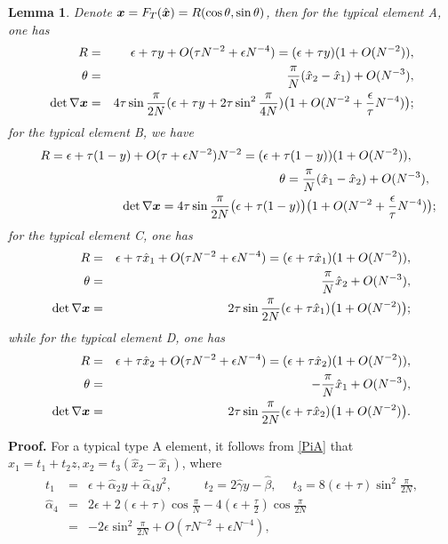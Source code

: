 \documentclass[12pt]{article}
\renewcommand{\vec}[1]{\mbox{\boldmath$#1$}}
\newtheorem{lemma}[theorem]{Lemma}
\numberwithin{equation}{section}
\begin{document}
\begin{lemma}\label{wgp}
Denote $\vec{x}=F_T(\hat{\vec{x}})=R(\cos \theta, \sin \theta)$, then for
the typical element A, one has
\begin{eqnarray}
R &=&\epsilon+\tau y+O(\tau N^{-2}+\epsilon N^{-4})=(\epsilon+
\tau y)(1+O(N^{-2})),\label{rhoA}\\
\theta &=&\frac{\pi}{N}(\hat{x}_2-\hat{x}_1)+O(N^{-3}),\label{thetaA}\\
\det \nabla \vec{x}&=&4\tau \sin \frac{\pi}{2N}(\epsilon+\tau y+2\tau
\sin^2 \frac{\pi}{4N})\big(1+O(N^{-2}+\frac{\epsilon}{\tau}N^{-4})\big); \label{detA}
\end{eqnarray}
for the typical element B, we have
\begin{eqnarray}
&&R =\epsilon+\tau (1-y)+O(\tau +\epsilon N^{-2})N^{-2}=(\epsilon+\tau (1-y))(1+O(N^{-2})),
\qquad \label{rhoB}\\
&&\theta =\frac{\pi}{N}(\hat{x}_1-\hat{x}_2)+O(N^{-3}),\;\;\label{thetaB}\\
&&\det \nabla \vec{x}=4\tau \sin \frac{\pi}{2N}\big(\epsilon+\tau(1-y)\big)
\big(1+O(N^{-2}+\frac{\epsilon}{\tau}N^{-4})\big); \label{detB}
\end{eqnarray}
for the typical element C, one has
\begin{eqnarray}
R &=&\epsilon+\tau \hat{x}_1+O(\tau N^{-2}+\epsilon N^{-4})=(\epsilon+
\tau \hat{x}_1)(1+O(N^{-2})),\label{rhoC}\\
\theta &=&\frac{\pi}{N}\hat{x}_2+O(N^{-3}),\label{thetaC}\\
\det \nabla \vec{x}&=&2\tau \sin \frac{\pi}{2N}(\epsilon+\tau \hat{x}_1)
\big(1+O(N^{-2})\big); \label{detC}
\end{eqnarray}
while for the typical element D, one has
\begin{eqnarray}
R &=&\epsilon+\tau \hat{x}_2+O(\tau N^{-2}+\epsilon N^{-4})=(\epsilon+
\tau \hat{x}_2)(1+O(N^{-2})),\label{rhoD}\\
\theta &=&-\frac{\pi}{N}\hat{x}_1+O(N^{-3}),\label{thetaD}\\
\det \nabla \vec{x}&=&2\tau \sin \frac{\pi}{2N}(\epsilon+\tau \hat{x}_2)
\big(1+O(N^{-2})\big). \label{detD}
\end{eqnarray}
\end{lemma}
\textbf{Proof.} For a typical type A element, it follows from \eqref{PiA} that
$x_1=t_1+t_2z, x_2=t_3(\hat{x}_2-\hat{x}_1)$, where
\begin{eqnarray}
t_1&=&\epsilon+\hat{\alpha}_2y+\hat{\alpha}_4 y^2, \qquad\;\;
t_2=2\hat{\gamma}y-\hat{\beta}, \quad\;
t_3=8(\epsilon+\tau)\sin^2{\frac{\pi}{2N}},\nonumber\\
\hat{\alpha}_4&=&2\epsilon+2(\epsilon+\tau)\cos{\frac{\pi}{N}}-
4(\epsilon+\frac{\tau}{2})\cos{\frac{\pi}{2N}}\nonumber\\
&=&-2\epsilon \sin^2\frac{\pi}{2N}+O(\tau N^{-2}+\epsilon N^{-4}),\label{halpha4}
\end{eqnarray}
\end{document}
